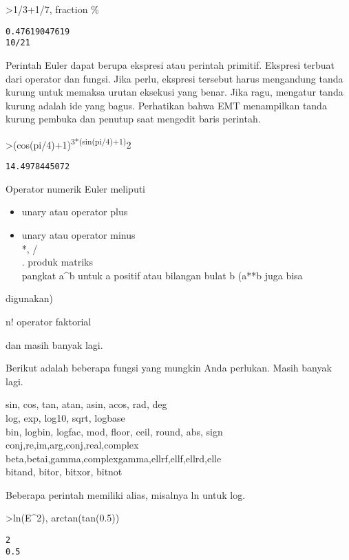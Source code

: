 \documentclass[
]{book}
\providecommand{\tightlist}{%
  \setlength{\itemsep}{0pt}\setlength{\parskip}{0pt}}
\begin{document}
\textgreater1/3+1/7, fraction \%

\begin{verbatim}
0.47619047619
10/21
\end{verbatim}

Perintah Euler dapat berupa ekspresi atau perintah primitif. Ekspresi terbuat dari operator dan fungsi. Jika perlu, ekspresi tersebut harus mengandung tanda kurung untuk memaksa urutan eksekusi yang benar. Jika ragu, mengatur tanda kurung adalah ide yang bagus. Perhatikan bahwa EMT menampilkan tanda kurung pembuka dan penutup saat mengedit baris perintah.

\textgreater(cos(pi/4)+1)\textsuperscript{3*(sin(pi/4)+1)}2

\begin{verbatim}
14.4978445072
\end{verbatim}

Operator numerik Euler meliputi

\begin{itemize}
\tightlist
\item
  unary atau operator plus\\
\item
  unary atau operator minus\\
  *, /\\
  . produk matriks\\
  pangkat a\^{}b untuk a positif atau bilangan bulat b (a**b juga bisa
\end{itemize}

digunakan)

n! operator faktorial

dan masih banyak lagi.

Berikut adalah beberapa fungsi yang mungkin Anda perlukan. Masih banyak lagi.

sin, cos, tan, atan, asin, acos, rad, deg\\
log, exp, log10, sqrt, logbase\\
bin, logbin, logfac, mod, floor, ceil, round, abs, sign\\
conj,re,im,arg,conj,real,complex\\
beta,betai,gamma,complexgamma,ellrf,ellf,ellrd,elle\\
bitand, bitor, bitxor, bitnot

Beberapa perintah memiliki alias, misalnya ln untuk log.

\textgreater ln(E\^{}2), arctan(tan(0.5))

\begin{verbatim}
2
0.5
\end{verbatim}
\end{document}
